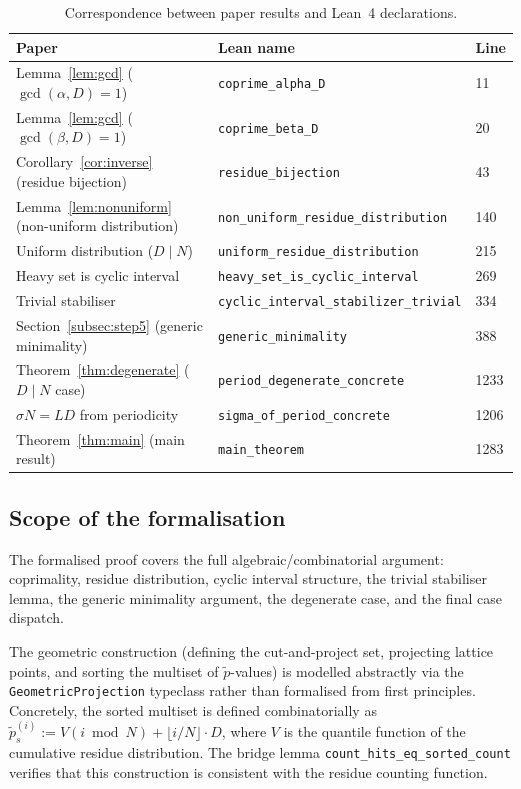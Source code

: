 \documentclass[11pt]{article}
\theoremstyle{plain}
\theoremstyle{definition}
\theoremstyle{remark}
\begin{document}
\begin{table}[ht]
\centering
\small
\begin{tabular}{lll}
\hline
\textbf{Paper} & \textbf{Lean name} & \textbf{Line} \\
\hline
Lemma~\ref{lem:gcd} ($\gcd(\alpha,D)=1$)
  & \texttt{coprime\_alpha\_D} & 11 \\
Lemma~\ref{lem:gcd} ($\gcd(\beta,D)=1$)
  & \texttt{coprime\_beta\_D} & 20 \\
Corollary~\ref{cor:inverse} (residue bijection)
  & \texttt{residue\_bijection} & 43 \\
Lemma~\ref{lem:nonuniform} (non-uniform distribution)
  & \texttt{non\_uniform\_residue\_distribution} & 140 \\
Uniform distribution ($D \mid N$)
  & \texttt{uniform\_residue\_distribution} & 215 \\
Heavy set is cyclic interval
  & \texttt{heavy\_set\_is\_cyclic\_interval} & 269 \\
Trivial stabiliser
  & \texttt{cyclic\_interval\_stabilizer\_trivial} & 334 \\
Section~\ref{subsec:step5} (generic minimality)
  & \texttt{generic\_minimality} & 388 \\
Theorem~\ref{thm:degenerate} ($D \mid N$ case)
  & \texttt{period\_degenerate\_concrete} & 1233 \\
$\sigma N = LD$ from periodicity
  & \texttt{sigma\_of\_period\_concrete} & 1206 \\
Theorem~\ref{thm:main} (main result)
  & \texttt{main\_theorem} & 1283 \\
\hline
\end{tabular}
\caption{Correspondence between paper results and Lean~4 declarations.}
\label{tab:lean}
\end{table}

\subsection{Scope of the formalisation}\label{subsec:lean_scope}

The formalised proof covers the full algebraic/combinatorial argument:
coprimality, residue distribution, cyclic interval structure, the
trivial stabiliser lemma, the generic minimality argument, the
degenerate case, and the final case dispatch.

The geometric construction (defining the cut-and-project set,
projecting lattice points, and sorting the multiset of
$\tilde{p}$-values) is modelled abstractly via the
\texttt{GeometricProjection} typeclass rather than formalised from
first principles.  Concretely, the sorted multiset is defined
combinatorially as $\tilde{p}^{(i)}_s := V(i \bmod N) + \lfloor i/N
\rfloor \cdot D$, where $V$ is the quantile function of the
cumulative residue distribution.  The bridge lemma
\texttt{count\_hits\_eq\_sorted\_count} verifies that this
construction is consistent with the residue counting function.
\end{document}
